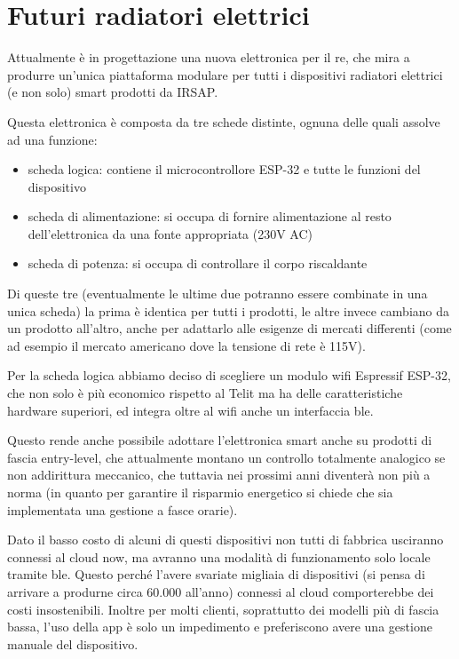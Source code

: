 \documentclass[12pt,a4paper,twoside,titlepage]{book}
\begin{document}
\section{Futuri radiatori elettrici}

Attualmente è in progettazione una nuova elettronica per il \acrshort{re},
che mira a produrre un'unica piattaforma modulare per tutti i dispositivi radiatori elettrici
(e non solo) smart prodotti da IRSAP.

Questa elettronica è composta da tre schede distinte, ognuna delle quali assolve
ad una funzione:
\begin{itemize}
    \item scheda logica: contiene il microcontrollore ESP-32 e tutte le funzioni del dispositivo
    \item scheda di alimentazione: si occupa di fornire alimentazione al resto dell'elettronica
        da una fonte appropriata (230V AC)
    \item scheda di potenza: si occupa di controllare il corpo riscaldante
\end{itemize}

Di queste tre (eventualmente le ultime due potranno essere combinate in una
unica scheda) la prima è identica per tutti i prodotti, le altre invece cambiano
da un prodotto all'altro, anche per adattarlo alle esigenze di mercati differenti
(come ad esempio il mercato americano dove la tensione di rete è 115V).

Per la scheda logica abbiamo deciso di scegliere un modulo \acrshort{wifi} Espressif
ESP-32, che non solo è più economico rispetto al Telit ma ha delle caratteristiche
hardware superiori, ed integra oltre al \Gls{wifi} anche un interfaccia \acrshort{ble}.

Questo rende anche possibile adottare l'elettronica smart anche su prodotti di
fascia entry-level, che attualmente montano un controllo totalmente analogico se non
addirittura meccanico, che tuttavia nei prossimi anni diventerà non più a norma (in
quanto per garantire il risparmio energetico si chiede che sia implementata una gestione
a fasce orarie).

Dato il basso costo di alcuni di questi dispositivi non tutti di fabbrica usciranno
connessi al cloud \Gls{now}, ma avranno una modalità di funzionamento solo locale
tramite \acrshort{ble}. Questo perché l'avere svariate migliaia di dispositivi
(si pensa di arrivare a produrne circa 60.000 all'anno) connessi al cloud comporterebbe
dei costi insostenibili. Inoltre per molti clienti, soprattutto dei modelli più di
fascia bassa, l'uso della app è solo un impedimento e preferiscono avere una gestione
manuale del dispositivo.
\end{document}
